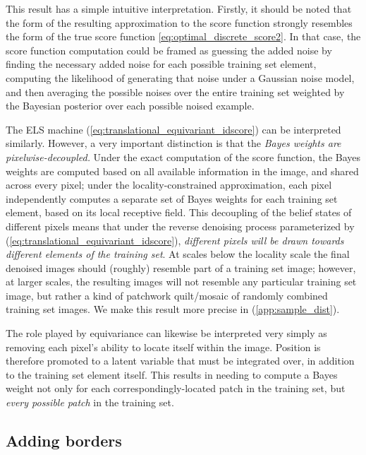 \documentclass{article}
\theoremstyle{plain}
\theoremstyle{definition}
\theoremstyle{remark}
\begin{document}
This result has a simple intuitive interpretation. Firstly, it should be noted that the form of the resulting approximation to the score function strongly resembles the form of the true score function \eqref{eq:optimal_discrete_score2}. In that case, the score function computation could be framed as guessing the added noise by finding the necessary added noise for each possible training set element, computing the likelihood of generating that noise under a Gaussian noise model, and then averaging the possible noises over the entire training set weighted by the Bayesian posterior over each possible noised example.

The ELS machine (\ref{eq:translational_equivariant_idscore}) can be interpreted similarly. However, a very important distinction is that the \textit{Bayes weights are pixelwise-decoupled.} Under the exact computation of the score function, the Bayes weights are computed based on all available information in the image, and shared across every pixel; under the locality-constrained approximation, each pixel independently computes a separate set of Bayes weights for each training set element, based on its local receptive field. This decoupling of the belief states of different pixels means that under the reverse denoising process parameterized by (\ref{eq:translational_equivariant_idscore}), \textit{different pixels will be drawn towards different elements of the training set}. At scales below the locality scale the final denoised images should (roughly) resemble part of a training set image; however, at larger scales, the resulting images will not resemble any particular training set image, but rather a kind of patchwork quilt/mosaic of randomly combined training set images. We make this result more precise in (\ref{app:sample_dist}).

The role played by equivariance can likewise be interpreted very simply as removing each pixel's ability to locate itself within the image. Position is therefore promoted to a latent variable that must be integrated over, in addition to the training set element itself. This results in needing to compute a Bayes weight not only for each correspondingly-located patch in the training set, but \textit{every possible patch} in the training set.


\subsection{Adding borders}
\label{app:addingborders}
\end{document}

